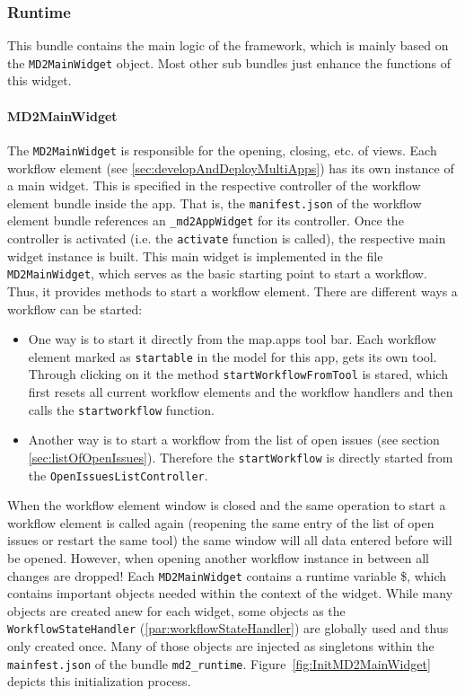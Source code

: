 \subsubsection{Runtime}

This bundle contains the main logic of the \MD \mapapps framework, which is mainly based on the \lstinline|MD2MainWidget| object. Most other sub bundles just enhance the functions of this widget.

\paragraph{MD2MainWidget}
The \lstinline!MD2MainWidget! is responsible for the opening, closing, etc. of views. 
Each workflow element (see \ref{sec:developAndDeployMultiApps}) has its own instance of a \MD main widget. This is specified in the respective controller of the workflow element bundle inside the app. That is, the \lstinline!manifest.json! of the workflow element bundle references an \lstinline!_md2AppWidget! for its controller. Once the controller is activated (i.e. the \lstinline!activate! function is called), the respective \MD main widget instance is built. This \MD main widget is implemented in the file \lstinline!MD2MainWidget!, which serves as the basic starting point to start a workflow. Thus, it provides methods to start a workflow element. There are different ways a workflow can be started:
\begin{itemize}
	\item One way is to start it directly from the map.apps tool bar. Each workflow element marked as \lstinline|startable| in the model for this app, gets its own tool. Through clicking on it the method \lstinline|startWorkflowFromTool| is stared, which first resets all current workflow elements and the workflow handlers and then calls the \lstinline|startworkflow| function.
	\item Another way is to start a workflow from the list of open issues (see section \ref{sec:listOfOpenIssues}). Therefore the \lstinline|startWorkflow| is directly started from the \lstinline|OpenIssuesListController|.
\end{itemize}
When the workflow element window is closed and the same operation to start a workflow element is called again (reopening the same entry of the list of open issues or restart the same tool) the same window will all data entered before will be opened. However, when opening another workflow instance in between all changes are dropped!
Each \lstinline|MD2MainWidget| contains a runtime variable \$, which contains important objects needed within the context of the widget. While many objects are created anew for each widget, some objects as the \lstinline|WorkflowStateHandler| (\cref{par:workflowStateHandler}) are globally used and thus only created once. Many of those objects are injected as singletons within the \lstinline|mainfest.json| of the bundle \lstinline|md2_runtime|.
Figure~\ref{fig:InitMD2MainWidget} depicts this initialization process.

